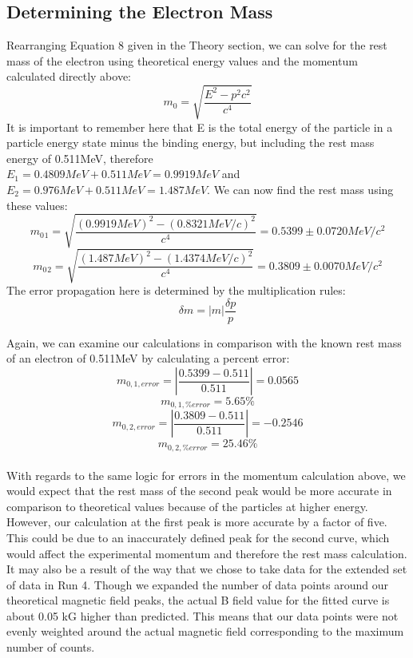 \subsection{Determining the Electron Mass}
Rearranging Equation 8 given in the Theory section, we can solve for the rest mass of the electron using theoretical energy values and the momentum calculated directly above:
\begin{equation} m_0=\sqrt{\frac{E^2-p^2c^2}{c^4}}\end{equation}
It is important to remember here that E is the total energy of the particle in a particle energy state minus the binding energy, but including the rest mass energy of 0.511MeV, therefore \\$E_1=0.4809MeV+0.511MeV=0.9919MeV$ and $E_2=0.976MeV+0.511MeV=1.487MeV$. We can now find the rest mass using these values:
\begin{equation} m_0{_1}=\sqrt{\frac{(0.9919MeV)^2-(0.8321MeV/c)^2}{c^4}}=0.5399\pm0.0720 MeV/c^2\end{equation}
\begin{equation} m_0{_2}=\sqrt{\frac{(1.487MeV)^2-(1.4374MeV/c)^2}{c^4}}=0.3809\pm0.0070 MeV/c^2\end{equation}
The error propagation here is determined by the multiplication rules:
\begin{equation} \delta m= |m|\frac{\delta p}{p} \end {equation}

Again, we can examine our calculations in comparison with the known rest mass of an electron of 0.511MeV by calculating a percent error:
\begin{equation} m_{0,1,error}=|\frac{0.5399-0.511}{0.511}|=0.0565\end{equation}
\begin{equation} m_{0,1,\%error}=5.65\%\end{equation}
\begin{equation} m_{0,2,error}=|\frac{0.3809-0.511}{0.511}|=-0.2546\end{equation}
\begin{equation} m_{0,2,\%error}=25.46\%\end{equation}\\
With regards to the same logic for errors in the momentum calculation above, we would expect that the rest mass of the second peak would be more accurate in comparison to theoretical values because of the particles at higher energy. However, our calculation at the first peak is more accurate by a factor of five. This could be due to an inaccurately defined peak for the second curve, which would affect the experimental momentum and therefore the rest mass calculation. It may also be a result of the way that we chose to take data for the extended set of data in Run 4. Though we expanded the number of data points around our theoretical magnetic field peaks, the actual B field value for the fitted curve is about 0.05 kG higher than predicted. This means that our data points were not evenly weighted around the actual magnetic field corresponding to the maximum number of counts. 

